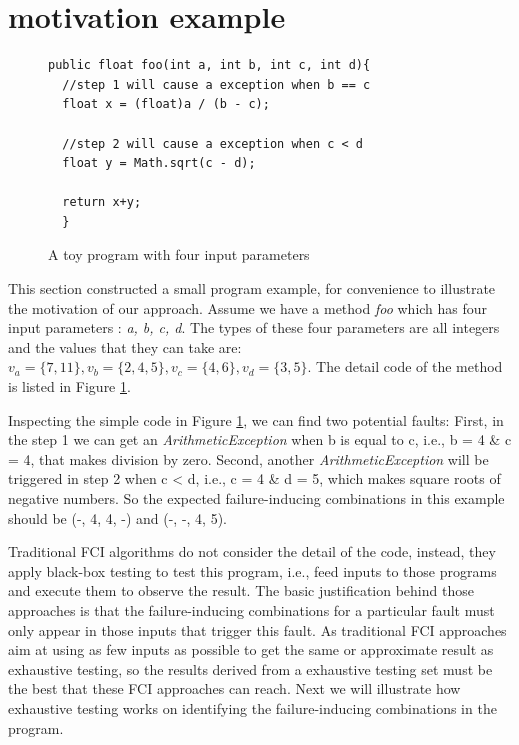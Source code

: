 \documentclass{sig-alternate}
\begin{document}
\section{motivation example}
\begin{figure}
\begin{verbatim}
public float foo(int a, int b, int c, int d){
  //step 1 will cause a exception when b == c
  float x = (float)a / (b - c);

  //step 2 will cause a exception when c < d
  float y = Math.sqrt(c - d);

  return x+y;
  }
\end{verbatim}
\caption{A toy program with four input parameters}
\label{toy-program}
\end{figure}
This section constructed a small program example, for convenience to illustrate the motivation of our approach. Assume we have a method \emph{foo} which has four input parameters : \emph{a, b, c, d}. The types of these four parameters are all integers and the values that they can take are: $v_{a} = \{7, 11\}, v_{b} = \{2, 4, 5\}, v_{c} = \{4, 6\}, v_{d} = \{3, 5\}$. The detail code of the method is listed in Figure \ref{toy-program}.

Inspecting the simple code in Figure \ref{toy-program}, we can find two potential faults: First, in the step 1 we can get an \emph{ArithmeticException} when b is equal to c, i.e.,  b = 4 \& c = 4, that makes division by zero. Second, another \emph{ArithmeticException} will be triggered in step 2 when c < d, i.e., c = 4 \& d = 5, which makes square roots of negative numbers. So the expected failure-inducing combinations in this example should be (-, 4, 4, -) and (-, -, 4, 5).

Traditional FCI algorithms do not consider the detail of the code, instead, they apply black-box testing to test this program, i.e., feed inputs to those programs and execute them to observe the result. The basic justification behind those approaches is that the failure-inducing combinations for a particular fault must only appear in those inputs that trigger this fault. As traditional FCI approaches aim at using as few inputs as possible to get the same or approximate result as exhaustive testing, so the results derived from a exhaustive testing set must be the best that these FCI approaches can reach. Next we will illustrate how exhaustive testing works on identifying the failure-inducing combinations in the program.
\end{document}
